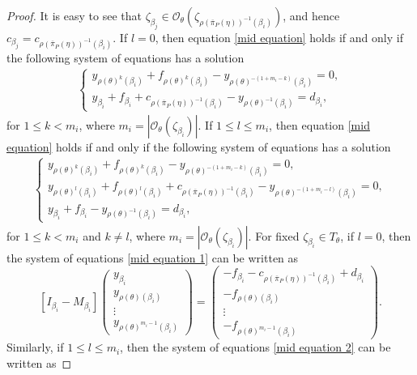 \documentclass[12pt]{amsart}
\numberwithin{equation}{section}
\begin{document}
\begin{proof}
It is easy to see that $\zeta_{\beta_j}\in \mathcal{O}_{\theta}(\zeta_{\rho(\overline{\pi}_P(\eta))^{-1}(\beta_i)})$, and hence $c_{\beta_j} = c_{\rho(\overline{\pi}_P(\eta))^{-1}(\beta_i)}$. If $l=0$, then equation \eqref{mid equation} holds if and only if the following system of equations has a solution 
\begin{align}\label{mid equation 1}
\begin{cases}
y_{\rho(\theta)^k(\beta_i)}+f_{\rho(\theta)^k(\beta_i)}-y_{\rho(\theta)^{-(1+m_i-k)}(\beta_i)}=0,\\
y_{\beta_i}+f_{\beta_i}+c_{\rho(\overline{\pi}_P(\eta))^{-1}(\beta_i)}-y_{\rho(\theta)^{-1}(\beta_i)}=d_{\beta_i},	
\end{cases} 
\end{align}
for $1\le k<m_i$, where $m_i=|\mathcal{O}_{\theta}(\zeta_{\beta_i})|$. If $1\leq l \leq m_i$, then equation \eqref{mid equation} holds if and only if the following system of equations has a solution 
\begin{align}\label{mid equation 2}
\begin{cases}
y_{\rho(\theta)^k(\beta_i)}+f_{\rho(\theta)^k(\beta_i)}-y_{\rho(\theta)^{-(1+m_i-k)}(\beta_i)}=0,\\
y_{\rho(\theta)^l(\beta_i)}+f_{\rho(\theta)^l(\beta_i)}+c_{\rho(\overline{\pi}_P(\eta))^{-1}(\beta_i)}-y_{\rho(\theta)^{-(1+m_i-l)}(\beta_i)}=0,\\
y_{\beta_i}+f_{\beta_i}-y_{\rho(\theta)^{-1}(\beta_i)}=d_{\beta_i},	
\end{cases} 
\end{align}
for $1\le k<m_i$ and $k\not=l$, where $m_i=|\mathcal{O}_{\theta}(\zeta_{\beta_i})|$.  For fixed $\zeta_{\beta_i}\in T_{\theta}$, if $l=0$, then the system of equations \eqref{mid equation 1} can be written as
$$
[I_{\beta_i}-M_{\beta_i}]
\left(\begin{matrix}
	y_{\beta_i}\\
	y_{\rho(\theta)(\beta_i)}\\
	\vdots\\
	y_{\rho(\theta)^{m_{i}-1}(\beta_i)}
\end{matrix}\right)=
\left(\begin{matrix}	-f_{\beta_i}-c_{\rho(\overline{\pi}_P(\eta))^{-1}(\beta_i)}+d_{\beta_i}\\
	-f_{\rho(\theta)(\beta_i)}\\
	\vdots\\
	-f_{\rho(\theta)^{m_{i}-1}(\beta_i)}
\end{matrix}\right).
$$ 
Similarly, if $1\leq l \leq m_i$, then the system of equations \eqref{mid equation 2} can be written as

\end{proof}
\end{document}
